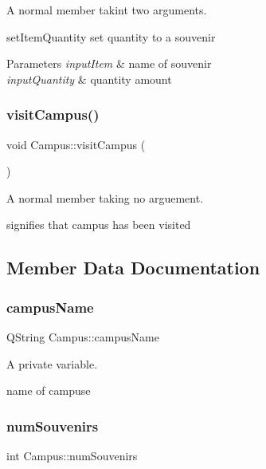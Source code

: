 A normal member takint two arguments. 

set\+Item\+Quantity set quantity to a souvenir 
\begin{DoxyParams}{Parameters}
{\em input\+Item} & name of souvenir \\
\hline
{\em input\+Quantity} & quantity amount \\
\hline
\end{DoxyParams}
\mbox{\label{class_campus_a23f09217ec446b76c152efb9fe4a4b56}} 
\subsubsection{\texorpdfstring{visit\+Campus()}{visitCampus()}}
{\footnotesize\ttfamily void Campus\+::visit\+Campus (\begin{DoxyParamCaption}{ }\end{DoxyParamCaption})}



A normal member taking no arguement. 

signifies that campus has been visited 

\subsection{Member Data Documentation}
\mbox{\label{class_campus_afdffffedc0ba5ead586c44545cd5528b}} 
\subsubsection{\texorpdfstring{campus\+Name}{campusName}}
{\footnotesize\ttfamily Q\+String Campus\+::campus\+Name\hspace{0.3cm}{\ttfamily [private]}}



A private variable. 

name of campuse \mbox{\label{class_campus_a996a6e6575b6421616b7bc639b778b29}} 
\subsubsection{\texorpdfstring{num\+Souvenirs}{numSouvenirs}}
{\footnotesize\ttfamily int Campus\+::num\+Souvenirs\hspace{0.3cm}{\ttfamily [private]}}



